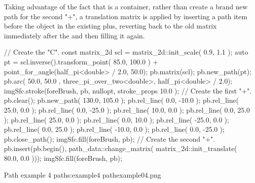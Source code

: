 \pnum
Taking advantage of the fact that  is a container, rather than create a brand new path for the second "+", a translation matrix is applied by inserting a  path item before the  object in the existing plus, reverting back to the old matrix immediately after the  and then filling it again.

\begin{codeblock}
// Create the "C".
const matrix_2d scl = matrix_2d::init_scale({ 0.9, 1.1 });
auto pt = scl.inverse().transform_point({ 85.0, 100.0 }) +
  point_for_angle(half_pi<double> / 2.0, 50.0);
pb.matrix(scl);
pb.new_path(pt);
pb.arc({ 50.0, 50.0 }, three_pi_over_two<double>, half_pi<double> / 2.0);
imgSfc.stroke(foreBrush, pb, nullopt, stroke_props{ 10.0 });
// Create the first "+".
pb.clear();
pb.new_path({ 130.0, 105.0 });
pb.rel_line({ 0.0, -10.0 });
pb.rel_line({ 25.0, 0.0 });
pb.rel_line({ 0.0, -25.0 });
pb.rel_line({ 10.0, 0.0 });
pb.rel_line({ 0.0, 25.0 });
pb.rel_line({ 25.0, 0.0 });
pb.rel_line({ 0.0, 10.0 });
pb.rel_line({ -25.0, 0.0 });
pb.rel_line({ 0.0, 25.0 });
pb.rel_line({ -10.0, 0.0 });
pb.rel_line({ 0.0, -25.0 });
pb.close_path();
imgSfc.fill(foreBrush, pb);
// Create the second "+".
pb.insert(pb.begin(), path_data::change_matrix(
  matrix_2d::init_translate({ 80.0, 0.0 })));
imgSfc.fill(foreBrush, pb);
\end{codeblock}

\begin{importgraphiciotwod}
{Path example 4}
{paths:example4}
{pathexample04.png}
\end{importgraphiciotwod}

\FloatBarrier
%
%
%
%
%
%
